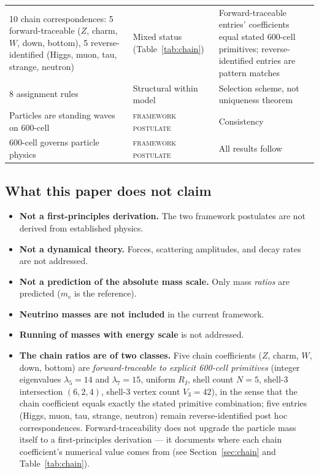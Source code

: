 \documentclass[12pt]{article}
\begin{document}
\begin{table}[ht]
\begin{tabular}{@{}lll@{}}
10 chain correspondences: 5 forward-traceable ($Z$, charm, $W$, down, bottom), 5 reverse-identified (Higgs, muon, tau, strange, neutron) & Mixed status (Table~\ref{tab:chain}) & Forward-traceable entries' coefficients equal stated 600-cell primitives; reverse-identified entries are pattern matches \\
8 assignment rules & Structural within model & Selection scheme, not uniqueness theorem \\
\midrule
Particles are standing waves on 600-cell & \textsc{framework postulate} & Consistency \\
600-cell governs particle physics & \textsc{framework postulate} & All results follow \\
\bottomrule
\end{tabular}
\end{table}

\subsection*{What this paper does not claim}

\begin{itemize}
    \item \textbf{Not a first-principles derivation.} The two framework postulates are not derived from established physics.
    \item \textbf{Not a dynamical theory.} Forces, scattering amplitudes, and decay rates are not addressed.
    \item \textbf{Not a prediction of the absolute mass scale.} Only mass \textit{ratios} are predicted ($m_e$ is the reference).
    \item \textbf{Neutrino masses are not included} in the current framework.
    \item \textbf{Running of masses with energy scale} is not addressed.
    \item \textbf{The chain ratios are of two classes.} Five chain coefficients ($Z$, charm, $W$, down, bottom) are \emph{forward-traceable to explicit 600-cell primitives} (integer eigenvalues $\lambda_5 = 14$ and $\lambda_7 = 15$, uniform $R_I$, shell count $N=5$, shell-3 intersection $(6,2,4)$, shell-3 vertex count $V_3 = 42$), in the sense that the chain coefficient equals exactly the stated primitive combination; five entries (Higgs, muon, tau, strange, neutron) remain reverse-identified post hoc correspondences. Forward-traceability does not upgrade the particle mass itself to a first-principles derivation --- it documents where each chain coefficient's numerical value comes from (see Section~\ref{sec:chain} and Table~\ref{tab:chain}).
\end{itemize}
\end{document}
